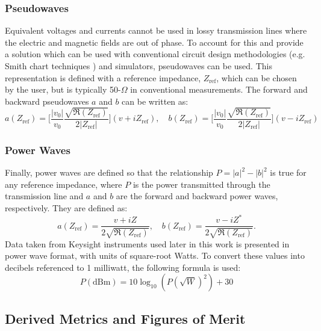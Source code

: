 \documentclass[../thesis/thesis.tex]{subfiles}
\begin{document}
\subsubsection{Pseudowaves}

Equivalent voltages and currents cannot be used in lossy transmission lines where the electric and magnetic fields are out of phase. To account for this and provide a solution which can be used with conventional circuit design methodologies (e.g. Smith chart techniques \cite{Smith_1939}) and simulators, pseudowaves can be used. This representation is defined with a reference impedance, $Z_\textrm{ref}$, which can be chosen by the user, but is typically 50-$\Omega$ in conventional measurements. The forward and backward pseudowaves $a$ and $b$ can be written as:
\begin{equation}
a(Z_\textrm{ref})=\bigg[\dfrac{|v_0|}{v_0}\dfrac{\sqrt{\Re(Z_\textrm{ref})}}{2|Z_\textrm{ref}|}\bigg](v+iZ_\textrm{ref}),\quad b(Z_\textrm{ref})=\bigg[\dfrac{|v_0|}{v_0}\dfrac{\sqrt{\Re(Z_\textrm{ref})}}{2|Z_\textrm{ref}|}\bigg](v-iZ_\textrm{ref})
\end{equation}

\subsubsection{Power Waves}

Finally, power waves are defined so that the relationship $P = |a|^2 - |b|^2$ is true for any reference impedance, where $P$ is the power transmitted through the transmission line and $a$ and $b$ are the forward and backward power waves, respectively. They are defined as:
\begin{equation}
a(Z_\textrm{ref})=\dfrac{v+iZ}{2\sqrt{\Re(Z_\textrm{ref})}},\quad b(Z_\textrm{ref})=\dfrac{v-iZ^*}{2\sqrt{\Re(Z_\textrm{ref})}}.
\end{equation}
Data taken from Keysight instruments used later in this work is presented in power wave format, with units of square-root Watts. To convert these values into decibels referenced to 1 milliwatt, the following formula is used:
\begin{equation}
P(\textrm{dBm}) = 10\log_{10}(P(\sqrt{W})^2) + 30
\end{equation}

\subsection{Derived Metrics and Figures of Merit}
\end{document}
